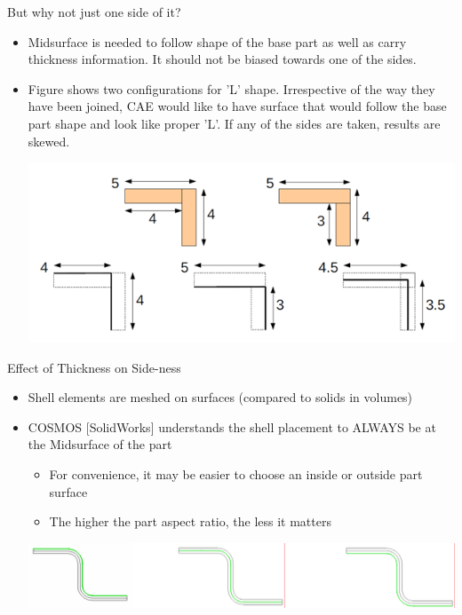 \begin{frame}{But why not just one side of it?}
\begin{itemize}[noitemsep,label=\textbullet,topsep=2pt,parsep=2pt,partopsep=2pt]
\item Midsurface is needed to follow shape of the base part as well as carry thickness information. It should not be biased towards one of the sides.
\item Figure shows two configurations for 'L' shape. Irrespective of the way they have been joined, CAE would like to have surface that would follow the base part shape and look like proper 'L'. If any of the sides are taken, results are skewed.

\includegraphics[scale=0.5]{../Common/images/OneSide.png}

\end{itemize}


\end{frame}


\begin{frame}{Effect of Thickness on Side-ness}
\begin{itemize}[noitemsep,label=\textbullet,topsep=2pt,parsep=2pt,partopsep=2pt]
\item Shell elements are meshed on surfaces (compared to solids in volumes)
\item COSMOS [SolidWorks] understands the shell placement to ALWAYS be at the Midsurface of the part
\begin{itemize}[noitemsep,label=\textbullet,topsep=2pt,parsep=2pt,partopsep=2pt]
\item For convenience, it may be easier to choose an inside or outside part surface
\item The higher the part aspect ratio, the less it matters
\end{itemize}

\vspace{0.5cm}

\includegraphics[scale=0.45]{../Common/images/EffectOfThickness.png}

\end{itemize}

\end{frame}



